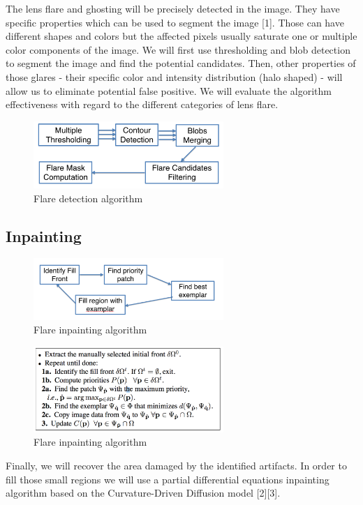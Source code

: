 \documentclass[10pt,twocolumn]{article}
\begin{document}
The lens flare and ghosting will be precisely detected in the image. They have specific properties which can be used to segment the image [1].
Those can have different shapes and colors but the affected pixels usually saturate one or multiple color components of the image. We will first use thresholding and blob detection to segment the image and find the potential candidates. Then, other properties of those glares - their specific color and intensity distribution (halo shaped) - will allow us to eliminate potential false positive. We will evaluate the algorithm effectiveness with regard to the different categories of lens flare.

\begin{figure}[ht!]
\centering
\includegraphics[width=72mm]{flow_detection.png}
\caption{Flare detection algorithm}
\end{figure}

\subsection{Inpainting}

\begin{figure}[ht!]
\centering
\includegraphics[width=72mm]{flow_inpainting.png}
\caption{Flare inpainting algorithm}
\end{figure}

\begin{figure}[ht!]
\centering
\includegraphics[width=72mm]{algo_inpainting.png}
\caption{Flare inpainting algorithm}
\end{figure}

Finally, we will recover the area damaged by the identified artifacts. In order to fill those small regions we will use a partial differential equations inpainting algorithm based on the Curvature-Driven Diffusion model [2][3].
\end{document}
